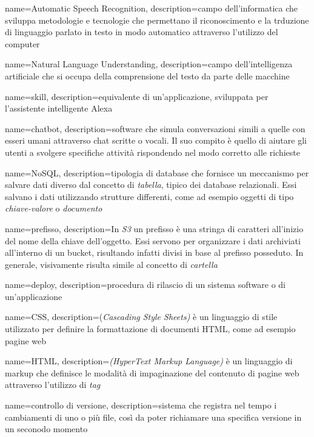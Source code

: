 {
	name=Automatic Speech Recognition,
	description={campo dell'informatica che sviluppa metodologie e tecnologie che permettano il riconoscimento e 
		la trduzione di linguaggio parlato in testo in modo automatico attraverso l'utilizzo del computer}
}

{
	name=Natural Language Understanding,
	description={campo dell'intelligenza artificiale che si occupa della comprensione del testo da parte delle macchine}
}

{
	name=skill,
	description={equivalente di un'applicazione, sviluppata per l'assistente intelligente Alexa}
}

{
	name=chatbot,
	description={software che simula conversazioni simili a quelle con esseri umani attraverso chat scritte o vocali. Il suo compito è quello di aiutare gli utenti a svolgere specifiche attività rispondendo nel modo corretto alle  richieste}
}

{
	name=NoSQL,
	description={tipologia di database che fornisce un meccanismo per salvare dati diverso dal concetto di
	\emph{tabella}, tipico dei database relazionali. Essi salvano i dati utilizzando strutture differenti, come ad
	esempio oggetti di tipo \emph{chiave-valore} o \emph{documento}}
}

{
	name=prefisso,
	description={In \emph{S3} un prefisso è una stringa di caratteri all'inizio del nome della chiave dell'oggetto. 
	Essi servono per organizzare i dati archiviati all'interno di un bucket, risultando infatti divisi in base al 
	prefisso posseduto. In generale, visivamente risulta simile al concetto di \emph{cartella}}
}

{
	name=deploy,
	description={procedura di rilascio di un sistema software o di un’applicazione}
}

{
	name=CSS,
	description={(\emph{Cascading Style Sheets)} è un linguaggio di stile utilizzato per definire la formattazione di 
	documenti \gls{HTML}, come ad esempio pagine web}
}

{
	name=HTML,
	description={\emph{(HyperText Markup Language)} è un linguaggio di markup che definisce le modalità di impaginazione
	del contenuto di pagine web attraverso l'utilizzo di \emph{tag}}
}

{
	name=controllo di versione,
	description={sistema che registra nel tempo i cambiamenti di uno o più file, così da poter richiamare una specifica versione in un seconodo momento}
}

